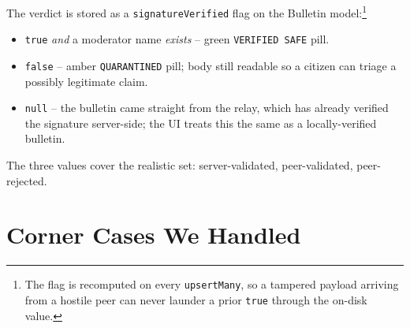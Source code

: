 \documentclass[11pt,a4paper]{article}
\begin{document}
The verdict is stored as a \texttt{signatureVerified} flag on the
Bulletin model:\footnote{The flag is recomputed on every
\texttt{upsertMany}, so a tampered payload arriving from a hostile
peer can never launder a prior \texttt{true} through the on-disk
value.}
\begin{itemize}[leftmargin=*]
  \item \texttt{true} \emph{and} a moderator name \emph{exists} --
        green \texttt{VERIFIED SAFE} pill.
  \item \texttt{false} -- amber \texttt{QUARANTINED} pill;
        body still readable so a citizen can triage a possibly
        legitimate claim.
  \item \texttt{null} -- the bulletin came straight from the relay,
        which has already verified the signature server-side; the
        UI treats this the same as a locally-verified bulletin.
\end{itemize}

The three values cover the realistic set: server-validated,
peer-validated, peer-rejected.

\section{Corner Cases We Handled}
\label{sec:corner-handled}
\end{document}
